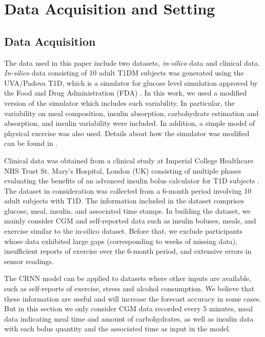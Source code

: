 \documentclass[a4paper, 10 pt, twocolumn]{IEEEtran}
\begin{document}
\section{ {Data Acquisition and Setting}}
\subsection{ {Data Acquisition}}{The data used in this paper include two datasets, \textit{in-silico} data and clinical data. \textit{In-silico} data consisting  of 10 adult T1DM subjects was generated using the UVA/Padova T1D, which is a simulator for
 glucose level simulation approved by the Food and Drug Administration (FDA) \cite{Man-UVA/PADOVA2014}.  In this work, we used a modified version of the simulator which includes such variability. In particular, the
 variability on meal composition, insulin absorption, carbohydrate estimation and absorption, and insulin variability were included. In addition, a simple model of physical exercise was also used. Details about how the
 simulator was modified can be found in \cite{herrero2017enhancing}.

Clinical data was obtained from a clinical study at Imperial College Healthcare NHS Trust St. Mary’s Hospital, London (UK) consisting of multiple phases evaluating the benefits of an advanced insulin bolus calculator for
T1D subjects \cite{Reddy-CliSafety2016}. The dataset in consideration was collected from a 6-month period involving 10 adult subjects with T1D.
The information included in the dataset comprises glucose, meal, insulin, and associated time stamps. In building the dataset, we mainly consider CGM and self-reported data such as insulin boluses, meals, and exercise
similar to the in-silico dataset. Before that, we exclude
participants whose data exhibited large gaps (corresponding to weeks of missing data), insufficient reports of exercise over the 6-month period, and extensive errors in sensor readings.

The CRNN model can be applied to datasets where other inputs are available, such as self-reports of exercise, stress and alcohol consumption. We believe that these information are useful and will increase the forecast
accuracy in some cases. But in this section we only consider CGM data recorded every 5 minutes, meal data indicating meal time and amount of carbohydrates, as well as insulin data with each bolus quantity and the
associated time as input in the model.
}
\end{document}

